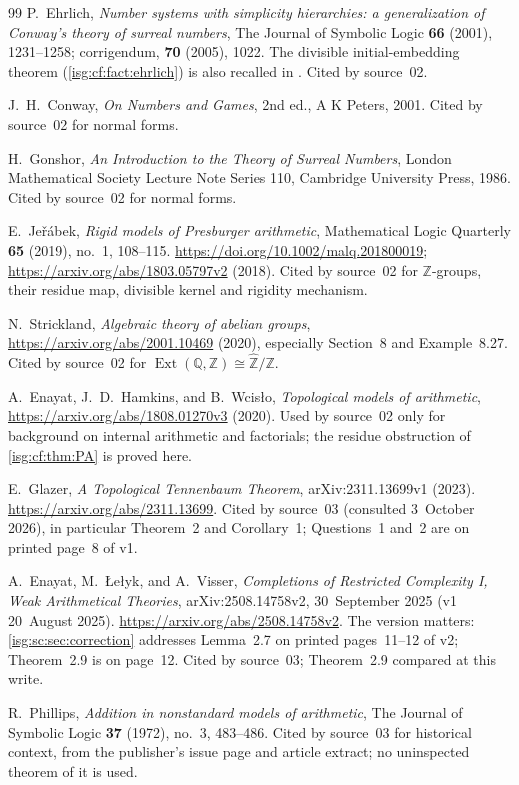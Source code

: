 \documentclass[11pt]{article}
\theoremstyle{definition}
\theoremstyle{remark}
\newcommand{\Z}{\mathbb{Z}}
\newcommand{\Q}{\mathbb{Q}}
\newcommand{\Zhat}{\widehat{\Z}}
\newcommand{\Ext}{\operatorname{Ext}}
\begin{document}
\begin{thebibliography}{99}
P.~Ehrlich, \emph{Number systems with simplicity hierarchies:
a generalization of Conway's theory of surreal numbers},
The Journal of Symbolic Logic \textbf{66} (2001), 1231--1258;
corrigendum, \textbf{70} (2005), 1022.
The divisible initial-embedding theorem (\cref{isg:cf:fact:ehrlich}) is
also recalled in \cite{EK}. Cited by source~02.

J.~H.~Conway, \emph{On Numbers and Games}, 2nd ed., A K Peters, 2001.
Cited by source~02 for normal forms.

H.~Gonshor, \emph{An Introduction to the Theory of Surreal Numbers},
London Mathematical Society Lecture Note Series 110,
Cambridge University Press, 1986. Cited by source~02 for normal forms.

E.~Je\v r\'abek, \emph{Rigid models of Presburger arithmetic},
Mathematical Logic Quarterly \textbf{65} (2019), no.~1, 108--115.
\url{https://doi.org/10.1002/malq.201800019};
\url{https://arxiv.org/abs/1803.05797v2} (2018).
Cited by source~02 for $\Z$-groups, their residue map, divisible kernel
and rigidity mechanism.

N.~Strickland, \emph{Algebraic theory of abelian groups},
\url{https://arxiv.org/abs/2001.10469} (2020),
especially Section~8 and Example~8.27. Cited by source~02 for
$\Ext(\Q,\Z)\cong\Zhat/\Z$.

A.~Enayat, J.~D.~Hamkins, and B.~Wcis\l o,
\emph{Topological models of arithmetic},
\url{https://arxiv.org/abs/1808.01270v3} (2020).
Used by source~02 only for background on internal arithmetic and
factorials; the residue obstruction of \cref{isg:cf:thm:PA} is proved
here.

E.~Glazer, \emph{A Topological Tennenbaum Theorem},
arXiv:2311.13699v1 (2023).
\url{https://arxiv.org/abs/2311.13699}.
Cited by source~03 (consulted 3~October 2026), in particular Theorem~2
and Corollary~1; Questions~1 and~2 are on printed page~8 of v1.

A.~Enayat, M.~\L e\l yk, and A.~Visser,
\emph{Completions of Restricted Complexity I, Weak Arithmetical
Theories}, arXiv:2508.14758v2, 30~September 2025 (v1 20~August 2025).
\url{https://arxiv.org/abs/2508.14758v2}.
The version matters: \cref{isg:sc:sec:correction} addresses Lemma~2.7 on
printed pages~11--12 of v2; Theorem~2.9 is on page~12. Cited by
source~03; Theorem~2.9 compared at this write.

R.~Phillips, \emph{Addition in nonstandard models of arithmetic},
The Journal of Symbolic Logic \textbf{37} (1972), no.~3, 483--486.
Cited by source~03 for historical context, from the publisher's issue
page and article extract; no uninspected theorem of it is used.


\end{thebibliography}
\end{document}
